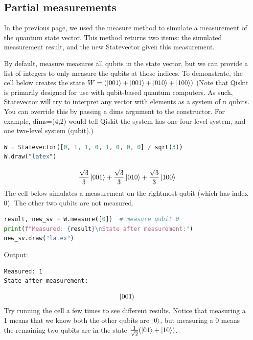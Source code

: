 \subsection{Partial measurements}
In the previous page, we used the measure method to simulate a measurement of the quantum state vector. This method returns two items: the simulated measurement result, and the new Statevector given this measurement.

By default, measure measures all qubits in the state vector, but we can provide a list of integers to only measure the qubits at those indices. To demonstrate, the cell below creates the state $W=(\ket{001}+\ket{001}+\ket{010}+\ket{100})$
(Note that Qiskit is primarily designed for use with qubit-based quantum computers. As such, Statevector will try to interpret any vector with elements as a system of n qubits. You can override this by passing a dims argument to the constructor. For example, dims=(4,2) would tell Qiskit the system has one four-level system, and one two-level system (qubit).)
\begin{lstlisting}[language=Python]
W = Statevector([0, 1, 1, 0, 1, 0, 0, 0] / sqrt(3))
W.draw("latex")
\end{lstlisting}
\[
\frac{\sqrt{3}}{3}\ket{001}+\frac{\sqrt{3}}{3}\ket{010}+\frac{\sqrt{3}}{3}\ket{100}
\]
The cell below simulates a measurement on the rightmost qubit (which has index 0). The other two qubits are not measured.
\begin{lstlisting}[language=Python]
result, new_sv = W.measure([0])  # measure qubit 0
print(f"Measured: {result}\nState after measurement:")
new_sv.draw("latex")
\end{lstlisting}
Output:
\begin{lstlisting}
Measured: 1
State after measurement:
\end{lstlisting}
\[
\ket{001}
\]
Try running the cell a few times to see different results. Notice that measuring a 1 means that we know both the other qubits are 
$\ket{0}$, but measuring a 0 means the remaining two qubits are in the state $\frac{1}{\sqrt{2}}(\ket{01}+\ket{10})$.


\chapterreferences
